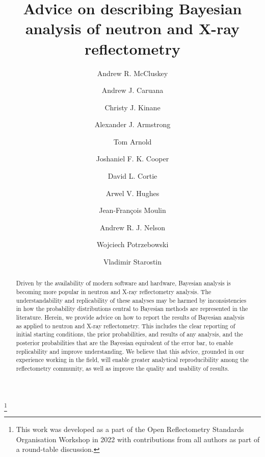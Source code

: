 \documentclass[reprint,superscriptaddress,aps,amsmath,linenumbers]{revtex4-2}
\begin{document}
\title{Advice on describing Bayesian analysis of neutron and X-ray reflectometry}
\thanks{This work was developed as a part of the Open Reflectometry Standards Organisation Workshop in 2022 with contributions from all authors as part of a round-table discussion.}

\author{Andrew R. McCluskey}
\author{Andrew J. Caruana}
\author{Christy J. Kinane}
\author{Alexander J. Armstrong}
\author{Tom Arnold}
\author{Joshaniel F. K. Cooper}
\author{David L. Cortie}
\author{Arwel V. Hughes}
\author{Jean-Fran\c{c}ois Moulin}
\author{Andrew R. J. Nelson}
\author{Wojciech Potrzebowski}
\author{Vladimir Starostin}
  

\begin{abstract}
  Driven by the availability of modern software and hardware, Bayesian analysis is becoming more popular in neutron and X-ray reflectometry analysis.
  The understandability and replicability of these analyses may be harmed by inconsistencies in how the probability distributions central to Bayesian methods are represented in the literature. 
  Herein, we provide advice on how to report the results of Bayesian analysis as applied to neutron and X-ray reflectometry. 
  This includes the clear reporting of initial starting conditions, the prior probabilities, and results of any analysis, and the posterior probabilities that are the Bayesian equivalent of the error bar, to enable replicability and improve understanding. 
  We believe that this advice, grounded in our experience working in the field, will enable greater analytical reproducibility among the reflectometry community, as well as improve the quality and usability of results. 
\end{abstract}
\end{document}
